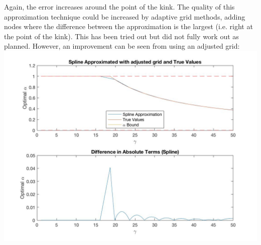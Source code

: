\documentclass{article}
\begin{document}
Again, the error increases around the point of the kink. The quality of this approximation technique could be increased by adaptive grid methods, adding nodes where the difference between the approximation is the largest (i.e. right at the point of the kink).
This has been tried out but did not fully work out as planned. However, an improvement can be seen from using an adjusted grid:\\
\includegraphics[width = \textwidth, keepaspectratio]{PS4Q3SPLINE_constrained_adjusted.jpg}
\end{document}
